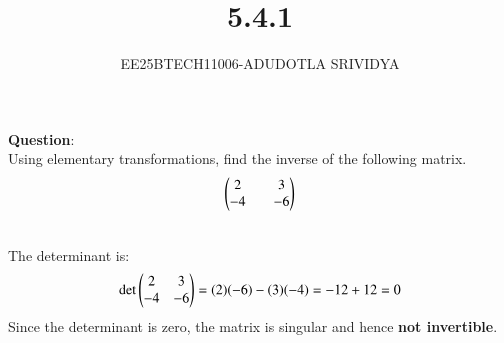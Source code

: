 \documentclass[journal]{IEEEtran}
\begin{document}

\vspace{3cm}

\title{5.4.1}
\author{EE25BTECH11006-ADUDOTLA SRIVIDYA}
 \maketitle
{\let\newpage\relax\maketitle}

\renewcommand{\thetable}{\theenumi}

\textbf{Question}:\\
Using elementary transformations, find the inverse of the following matrix. 
\begin{align*}
    \begin{pmatrix}2&&3\\-4&&-6\end{pmatrix}
\end{align*}

\solution \\
The determinant is:
\begin{align}
\det \begin{pmatrix}2 & 3 \\ -4 & -6\end{pmatrix} = (2)(-6) - (3)(-4) = -12 + 12 = 0
\end{align}
Since the determinant is zero, the matrix is singular and hence \textbf{not invertible}.
\end{document}
